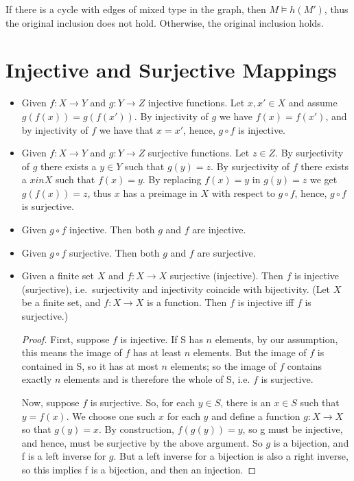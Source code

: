 \documentclass[a4paper,12pt]{article}
\begin{document}
If there is a cycle with edges of mixed type in the graph, then $M \models h(M')$, thus the original inclusion does not hold. Otherwise, the original inclusion holds.


\section{Injective and Surjective Mappings}

\begin{itemize}
\item{Given $f : X \rightarrow Y$ and $g : Y \rightarrow Z$ injective functions.
Let $x, x' \in X$ and assume $g(f(x)) = g(f(x'))$. By injectivity of $g$ we have $f(x) = f(x')$, and by injectivity of $f$ we have that $x = x'$, hence, $g \circ f$ is injective.
}
\item{Given $f : X \rightarrow Y$ and $g : Y \rightarrow Z$ surjective functions.
Let $z \in Z$. By surjectivity of $g$ there exists a $y \in Y$ such that $g(y) = z$. By surjectivity of $f$ there exists a $x in X$ such that $f(x) = y$. By replacing $f(x) = y$ in $g(y) = z$ we get $g(f(x)) = z$, thus $x$ has a preimage in $X$ with respect to $g \circ f$, hence, $g \circ f$ is surjective.
}
\item{
Given $g \circ f$ injective. Then both $g$ and $f$ are injective.
}
\item{
Given $g \circ f$ surjective. Then both $g$ and $f$ are surjective.
}
\item{
Given a finite set $X$ and $f : X \rightarrow X$ surjective (injective). Then $f$ is injective (surjective), i.e.\ surjectivity and injectivity coincide with bijectivity.
(Let $X$ be a finite set, and $f: X \rightarrow X $ is a function. Then $f$ is injective iff $f$ is surjective.)
\begin{proof}
 First, suppose $f$ is injective. If S has $n$ elements, by our assumption, this means the image of $f$ has at least $n$ elements. But the image of $f$ is contained in S, so it has at most $n$ elements; so the image of $f$ contains exactly $n$ elements and is therefore the whole of S, i.e. $f$ is surjective.

 Now, suppose $f$ is surjective. So, for each $y \in S$, there is an $x \in S$ such that $y=f(x)$. We choose one such $x$ for each $y$ and define a function $g:X \rightarrow X$ so that $g(y)=x$. By construction, $f(g(y))=y$, so g must be injective, and hence, must be surjective by the above argument. So $g$ is a bijection, and f is a left inverse for $g$. But a left inverse for a bijection is also a right inverse, so this implies f is a bijection, and then an injection.
\end{proof}
}
\end{itemize}
\end{document}
